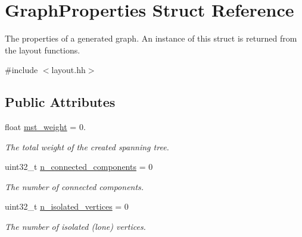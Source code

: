 \hypertarget{structGraphProperties}{}\section{Graph\+Properties Struct Reference}
\label{structGraphProperties}


The properties of a generated graph. An instance of this struct is returned from the layout functions.  




{\ttfamily \#include $<$layout.\+hh$>$}

\subsection*{Public Attributes}
\begin{DoxyCompactItemize}
\item 
\mbox{\label{structGraphProperties_a1924c22c71ea4f60ed7e31db768d5a9b}} 
float \hyperlink{structGraphProperties_a1924c22c71ea4f60ed7e31db768d5a9b}{mst\+\_\+weight} = 0.
\begin{DoxyCompactList}\small\item\em The total weight of the created spanning tree. \end{DoxyCompactList}\item 
\mbox{\label{structGraphProperties_a268ebbd3f3ef13fb56e44adfbd2583ca}} 
uint32\+\_\+t \hyperlink{structGraphProperties_a268ebbd3f3ef13fb56e44adfbd2583ca}{n\+\_\+connected\+\_\+components} = 0
\begin{DoxyCompactList}\small\item\em The number of connected components. \end{DoxyCompactList}\item 
\mbox{\label{structGraphProperties_ad3eec03efec4480e80c5510b896660ae}} 
uint32\+\_\+t \hyperlink{structGraphProperties_ad3eec03efec4480e80c5510b896660ae}{n\+\_\+isolated\+\_\+vertices} = 0
\begin{DoxyCompactList}\small\item\em The number of isolated (lone) vertices. \end{DoxyCompactList}\item 
\mbox{\label{structGraphProperties_ae1515b9c7e47a9ed3034bb219871d1c1}} 

\end{DoxyCompactItemize}

